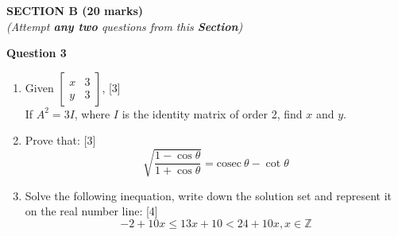\newpage
\begin{center}
   \large
   \textbf{SECTION B (20 marks)}\\
   \vspace{5mm}
   \normalsize
   \textit{(Attempt \textbf{any two} questions from this \textbf{Section})}
\end{center}
\par

\noindent
\textbf{Question 3}
\begin{enumerate}[label=(\roman*)]

    \item Given $\begin{bmatrix} x & 3 \\ y & 3 \end{bmatrix}$, \hfill [3] \\
        If $A^2 = 3I$, where $I$ is the identity matrix of order 2, find $x$ and $y$.

    \item Prove that: \hfill [3] \\
        \[ \sqrt{\frac{1 - \cos \theta}{ 1 + \cos \theta}} = \mathrm{cosec} \ \theta - \cot \theta \]

    \item Solve the following inequation, write down the solution set and represent
        it on the real number line: \hfill [4]
        \[-2 + 10x \leq 13x + 10 < 24 + 10x, x \in \mathbb{Z}\]

\end{enumerate}

